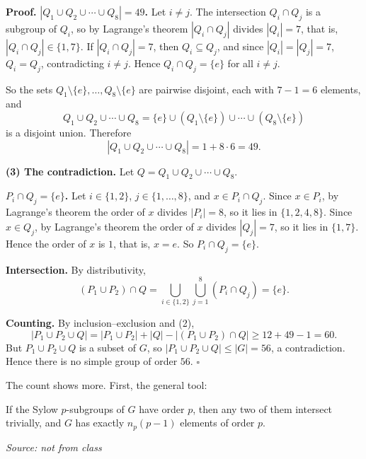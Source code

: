 \documentclass[11pt]{report}
\renewenvironment{proof}[1][Proof]{\noindent\textbf{#1.} }{\hfill$\square$\par\vspace{5pt}}
\newcommand{\srcline}[1]{\par\hfill{\footnotesize\textit{Source: #1}}}
\begin{document}
\begin{proof}
\textbf{$|Q_1 \cup Q_2 \cup \cdots \cup Q_8| = 49$.} Let $i \neq j$. The intersection $Q_i \cap Q_j$ is a subgroup of $Q_i$, so by Lagrange's theorem $|Q_i \cap Q_j|$ divides $|Q_i| = 7$, that is, $|Q_i \cap Q_j| \in \{1, 7\}$. If $|Q_i \cap Q_j| = 7$, then $Q_i \subseteq Q_j$, and since $|Q_i| = |Q_j| = 7$, $Q_i = Q_j$, contradicting $i \neq j$. Hence $Q_i \cap Q_j = \{e\}$ for all $i \neq j$.

So the sets $Q_1 \setminus \{e\}, \dots, Q_8 \setminus \{e\}$ are pairwise disjoint, each with $7 - 1 = 6$ elements, and
\[
Q_1 \cup Q_2 \cup \cdots \cup Q_8 = \{e\} \cup (Q_1 \setminus \{e\}) \cup \cdots \cup (Q_8 \setminus \{e\})
\]
is a disjoint union. Therefore
\[
|Q_1 \cup Q_2 \cup \cdots \cup Q_8| = 1 + 8 \cdot 6 = 49.
\]

\textbf{(3) The contradiction.} Let $Q = Q_1 \cup Q_2 \cup \cdots \cup Q_8$.

\textbf{$P_i \cap Q_j = \{e\}$.} Let $i \in \{1, 2\}$, $j \in \{1, \dots, 8\}$, and $x \in P_i \cap Q_j$. Since $x \in P_i$, by Lagrange's theorem the order of $x$ divides $|P_i| = 8$, so it lies in $\{1, 2, 4, 8\}$. Since $x \in Q_j$, by Lagrange's theorem the order of $x$ divides $|Q_j| = 7$, so it lies in $\{1, 7\}$. Hence the order of $x$ is $1$, that is, $x = e$. So $P_i \cap Q_j = \{e\}$.

\textbf{Intersection.} By distributivity,
\[
(P_1 \cup P_2) \cap Q = \bigcup_{i \in \{1, 2\}} \bigcup_{j = 1}^{8} (P_i \cap Q_j) = \{e\}.
\]

\textbf{Counting.} By inclusion--exclusion and (2),
\[
|P_1 \cup P_2 \cup Q| = |P_1 \cup P_2| + |Q| - |(P_1 \cup P_2) \cap Q| \geq 12 + 49 - 1 = 60.
\]
But $P_1 \cup P_2 \cup Q$ is a subset of $G$, so $|P_1 \cup P_2 \cup Q| \leq |G| = 56$, a contradiction. Hence there is no simple group of order $56$.
\end{proof}

The count shows more. First, the general tool:

\begin{lembox}\label{lem:count-elements-order-p}
If the Sylow $p$-subgroups of $G$ have order $p$, then any two of them intersect trivially, and $G$ has exactly $n_p(p - 1)$ elements of order $p$.
\srcline{not from class}
\end{lembox}
\end{document}
